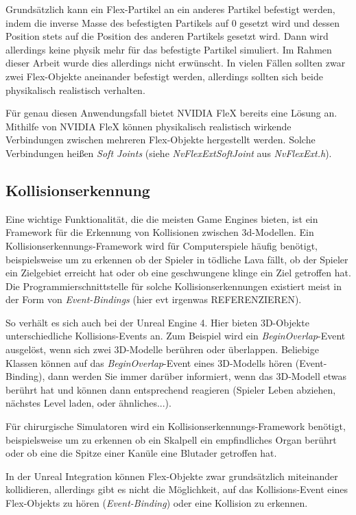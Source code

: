 Grundsätzlich kann ein Flex-Partikel an ein anderes Partikel befestigt werden, indem die inverse Masse des befestigten Partikels auf 0 gesetzt wird und dessen Position stets auf die Position des anderen Partikels gesetzt wird. Dann wird allerdings keine physik mehr für das befestigte Partikel simuliert. Im Rahmen dieser Arbeit wurde dies allerdings nicht erwünscht. In vielen Fällen sollten zwar zwei Flex-Objekte aneinander befestigt werden, allerdings sollten sich beide physikalisch realistisch verhalten. 

Für genau diesen Anwendungsfall bietet NVIDIA FleX bereits eine Lösung an. Mithilfe von NVIDIA FleX können physikalisch realistisch wirkende Verbindungen zwischen mehreren Flex-Objekte hergestellt werden. Solche Verbindungen heißen \textit{Soft Joints} (siehe \textit{NvFlexExtSoftJoint} aus \textit{NvFlexExt.h}).

\subsection{Kollisionserkennung}


Eine wichtige Funktionalität, die die meisten Game Engines bieten, ist ein Framework für die Erkennung von Kollisionen zwischen 3d-Modellen. 
Ein Kollisionserkennungs-Framework wird für Computerspiele häufig benötigt, beispielsweise um zu erkennen ob der Spieler in tödliche Lava fällt, ob der Spieler ein Zielgebiet erreicht hat oder ob eine geschwungene klinge ein Ziel getroffen hat. Die Programmierschnittstelle für solche Kollisionserkennungen existiert meist in der Form von \textit{Event-Bindings} (hier evt irgenwas REFERENZIEREN). 

So verhält es sich auch bei der Unreal Engine 4. Hier bieten 3D-Objekte unterschiedliche Kollisions-Events an. Zum Beispiel wird ein \textit{BeginOverlap}-Event ausgelöst, wenn sich zwei 3D-Modelle berühren oder überlappen. Beliebige Klassen können auf das \textit{BeginOverlap}-Event eines 3D-Modells hören (Event-Binding), dann werden Sie immer darüber informiert, wenn das 3D-Modell etwas berührt hat und können dann entsprechend reagieren (Spieler Leben abziehen, nächstes Level laden, oder ähnliches...).

Für chirurgische Simulatoren wird ein Kollisionserkennungs-Framework benötigt, beispielsweise um zu erkennen ob ein Skalpell ein empfindliches Organ berührt oder ob eine die Spitze einer Kanüle eine Blutader getroffen hat.

In der Unreal Integration können Flex-Objekte zwar grundsätzlich miteinander kollidieren, allerdings gibt es nicht die Möglichkeit, auf das Kollisions-Event eines Flex-Objekts zu hören (\textit{Event-Binding}) oder eine Kollision zu erkennen.

